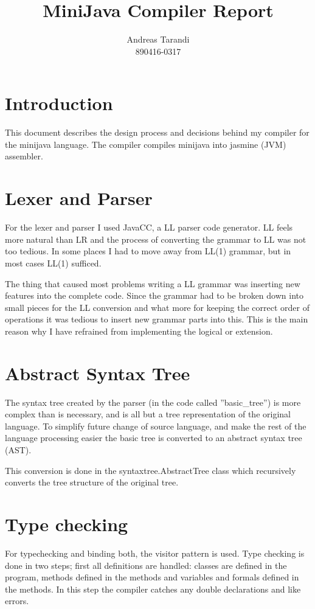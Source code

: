 \documentclass[a4paper,11pt]{article}
\author{Andreas Tarandi\\890416-0317}
\title{MiniJava Compiler Report}
\begin{document}
  \maketitle

  \section{Introduction}
  This document describes the design process and decisions behind my compiler for the minijava language. The compiler compiles minijava into jasmine (JVM) assembler.

  \section{Lexer and Parser}
  For the lexer and parser I used JavaCC, a LL parser code generator. LL feels more natural than LR and the
  process of converting the grammar to LL was not too tedious. In some places I had to move away from LL(1) grammar, but in most cases LL(1) sufficed.

  The thing that caused most problems writing a LL grammar was inserting new features into the complete code. Since the grammar had to be broken down into small pieces for
  the LL conversion and what more for keeping the correct order of operations it was tedious to insert new grammar parts into this. This is the main reason why I have refrained from
  implementing the logical or extension.

  \section{Abstract Syntax Tree}
  The syntax tree created by the parser (in the code called ''basic\_tree'') is more complex than
  is necessary, and is all but a tree representation of the original language. To simplify future change of source language, and make the rest of the language processing easier the basic tree is
  converted to an abstract syntax tree (AST).

  This conversion is done in the syntaxtree.AbstractTree class which recursively converts the tree structure of the original tree.

  \section{Type checking}

  For typechecking and binding both, the visitor pattern is used. Type checking is done in two steps; first all definitions are handled:
  classes are defined in the program, methods defined in the methods and variables and formals defined in the methods. In this step the compiler catches any
  double declarations and like errors.
\end{document}
